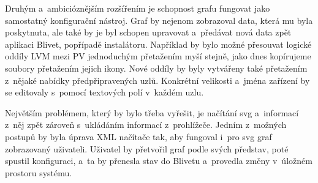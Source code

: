 \documentclass[color,table,oneside,nolot,nolof]{fithesis}
\begin{document}
	Druhým a~ambicióznějším rozšířením je schopnost grafu fungovat jako samostatný konfigurační nástroj. Graf by nejenom zobrazoval data, která mu byla poskytnuta, ale také by je byl
	schopen upravovat a~předávat nová data zpět aplikaci Blivet, popřípadě instalátoru. Například by bylo možné přesouvat logické oddíly LVM mezi PV jednoduchým 
	přetažením myší stejně, jako dnes kopírujeme soubory přetažením jejich ikony. Nové oddíly by byly vytvářeny také přetažením z~nějaké nabídky předpřipravených uzlů. Konkrétní velikosti
	a~jména zařízení by se editovaly s~pomocí textových polí v~každém uzlu.
	
	Největším problémem, který by bylo třeba vyřešit, je načítání svg a~informací z~něj zpět zároveň s~ukládáním informací z~prohlížeče. 
	Jedním z~možných postupů by byla úprava XML načítače tak, aby fungoval i~pro svg graf zobrazovaný uživateli. Uživatel by přetvořil graf podle svých představ, poté spustil 
	konfiguraci, a~ta by přenesla stav do Blivetu a~provedla změny v~úložném prostoru systému. 

	\printbibliography
\end{document}
